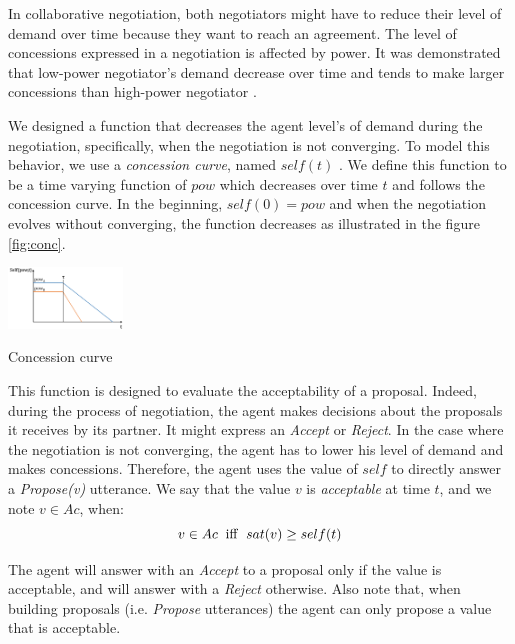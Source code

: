 \documentclass[conference, letterpaper]{IEEEtran}
\begin{document}
	In collaborative negotiation, both negotiators might have to reduce their level of demand over time because they want to reach an agreement. The level of concessions expressed in a negotiation is affected by power. It was demonstrated that low-power negotiator's demand decrease over time and tends to make larger concessions than high-power negotiator \cite{de1995impact}.
	
	We designed a function that decreases the agent level's of demand during the negotiation, specifically, when the negotiation is not converging.  To model this behavior, we use a \emph{concession curve}, named $self(t)$ . %
	We define this function to be a time varying function of $pow$ which decreases over time $t$ and follows the concession curve. In the beginning, $self(0) = pow$ and when the negotiation evolves without converging, the function decreases as illustrated in the figure \ref{fig:conc}.
	
	
	\begin{floatingfigure}[l]{1.3in}
		\captionsetup{justification=centering}
		\includegraphics[width=1.2in]{figs/sv3.png}
		\caption{\label{fig:conc}Concession curve}
	\end{floatingfigure} 
	
	
	This function is designed to evaluate the acceptability of a proposal. Indeed, during the process of negotiation, the agent makes decisions about the proposals it receives by its partner. It might express an \emph{Accept} or \emph{Reject}. In the case where the negotiation is not converging, the agent has to lower his level of demand and makes concessions. Therefore, the agent uses the value of $self$ to directly answer a \emph{Propose(v)} utterance. We say that the value $v$ is \emph{acceptable} at time $t$, and we note $v \in Ac$, when:
	\begin{equation}
	v\in Ac\hspace{2mm}\mathrm{iff}\hspace{2mm}sat(v) \geq self(t)
	\end{equation}
	
	The agent will answer with an \emph{Accept} to a proposal only if the value is acceptable, and will answer with a \emph{Reject} otherwise. Also note that, when building proposals (i.e. \emph{Propose} utterances) the agent can only propose a value that is acceptable.
	
\end{document}

